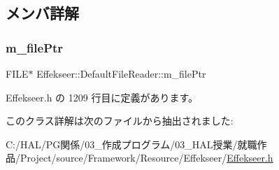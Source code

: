 \subsection{メンバ詳解}
\mbox{\label{class_effekseer_1_1_default_file_reader_a8377211af30419cd2a8b6d220fe8972d}} 
\subsubsection{\texorpdfstring{m\+\_\+file\+Ptr}{m\_filePtr}}
{\footnotesize\ttfamily F\+I\+LE$\ast$ Effekseer\+::\+Default\+File\+Reader\+::m\+\_\+file\+Ptr\hspace{0.3cm}{\ttfamily [private]}}



 Effekseer.\+h の 1209 行目に定義があります。



このクラス詳解は次のファイルから抽出されました\+:\begin{DoxyCompactItemize}
\item 
C\+:/\+H\+A\+L/\+P\+G関係/03\+\_\+作成プログラム/03\+\_\+\+H\+A\+L授業/就職作品/\+Project/source/\+Framework/\+Resource/\+Effekseer/\mbox{\hyperlink{_effekseer_8h}{Effekseer.\+h}}\end{DoxyCompactItemize}
